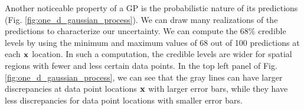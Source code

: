 Another noticeable property of a GP is the probabilistic nature of its predictions
(Fig. \ref{fig:one_d_gaussian_process}).
We can draw many realizations of the predictions to characterize our uncertainty. 
We can compute the 68\% credible levels
by using the minimum and maximum values of 68 out of 100 predictions at each
$\mathbf{x}$ location.
In such a computation, the credible levels are wider for spatial regions 
with fewer and less certain data points. In the top left panel of Fig.
\ref{fig:one_d_gaussian_process}, we can see that the gray lines can have
larger discrepancies at data point locations $\mathbf{x}$ with larger error bars, while they
have less discrepancies for data point locations with smaller error bars. 


